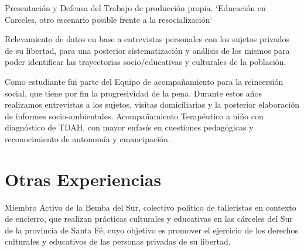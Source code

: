 \documentclass[11pt,a4paper,sans]{moderncv}        %
\begin{document}
  {}
\vspace{3mm}

  {
    Presentación y Defensa del Trabajo de producción propia. `Educación en Carceles, otro escenario posible frente a la resocialización`
  }
\vspace{3mm}

  {
    Relevamiento de datos en base a entrevistas personales con los sujetos privados de su libertad, para una posterior sistematización y análisis de los mismos para poder identificar las trayectorias socio/educativas y culturales de la población.  
  }
\vspace{3mm}

  {
    Como estudiante fui parte del Equipo de acompañamiento para la reincersión social, que tiene por fin la progresividad de la pena. Durante estos años realizamos entrevistas a los sujetos, visitas domiciliarias y la posterior elaboración de informes socio-ambientales.
  }
\vspace{3mm}
  {
    Acompañamiento Terap\'eutico a niño con diagnóstico de TDAH, con mayor enfasís en cuestiones pedagógicas y reconocimiento de autonomía y emancipación.
  }
\vspace{2mm}

\section{Otras Experiencias}
  {
    Miembro Activo de la Bemba del Sur, colectivo político de talleristas en contexto de encierro, que realizan prácticas culturales y educativas en las cárceles del Sur de la provincia de Santa Fé, cuyo objetivo es promover el ejercicio de los derechos culturales y educativos de las personas privadas de su libertad.
  }
\end{document}
